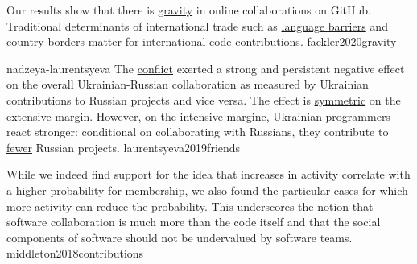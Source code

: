 \documentclass{article}
\begin{document}
  {Our results show that there is \ul{gravity} in online collaborations on GitHub. Traditional determinants of international trade such as \ul{language barriers} and \ul{country borders} matter for international code contributions.}
  {fackler2020gravity}

\qte
  {nadzeya-laurentsyeva}
  {The \ul{conflict} exerted a strong and persistent negative effect on the overall
  Ukrainian-Russian collaboration as measured by Ukrainian contributions
  to Russian projects and vice versa. The effect is \ul{symmetric} on the extensive margin.
  However, on the intensive margine, Ukrainian programmers react stronger: conditional
  on collaborating with Russians, they contribute to \ul{fewer} Russian projects.}
  {laurentsyeva2019friends}

  {While we indeed find support for the idea that increases in activity correlate with a higher probability for membership, we also found the particular cases for which more activity can reduce the probability. This underscores the notion that software collaboration is much more than the code itself and that the social components of software should not be undervalued by software teams.}
  {middleton2018contributions}
\end{document}
